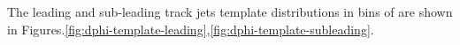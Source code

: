 \clearpage
%
%
%
%
%
%


\clearpage
\subsection{\dphi}

The leading and sub-leading track jets template \subsdzero distributions in bins of \dphi are shown in Figures.\ref{fig:dphi-template-leading},\ref{fig:dphi-template-subleading}.


